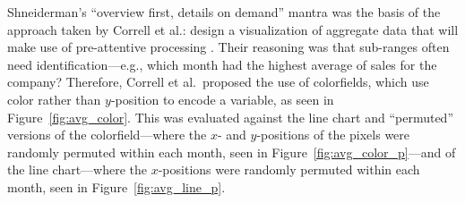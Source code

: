 \documentclass{article} %
\begin{document}
Shneiderman's ``overview first, details on demand'' mantra \cite{shneiderman1996} was the basis of the approach taken by Correll et al.: design a visualization of aggregate data that will make use of pre-attentive processing \cite{correll2012}.  Their reasoning was that sub-ranges often need identification---e.g., which month had the highest average of sales for the company?   Therefore, Correll et al.\ proposed the use of colorfields, which use color rather than $y$-position to encode a variable, as seen in Figure~\ref{fig:avg_color}.  This was evaluated against the line chart and ``permuted'' versions of the colorfield---where the $x$- and $y$-positions of the pixels were randomly permuted within each month, seen in Figure~\ref{fig:avg_color_p}---and of the line chart---where the $x$-positions were randomly permuted within each month, seen in Figure~\ref{fig:avg_line_p}.
\end{document}
